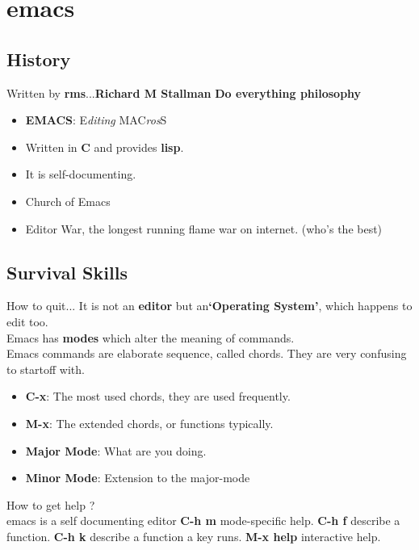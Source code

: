 \documentclass{beamer}
\begin{document}
\section{emacs}

\subsection{History}
\begin{frame}{Written by \textbf{rms}...}{\textbf{Richard M Stallman}}
	\textbf{Do everything philosophy} \\
	\pause
	\begin{itemize}
		\item {
				\textbf{EMACS}: \alert{E}\textit{diting} \alert{MAC}\textit{ros}\alert{S}
				\pause

			}
		\item {
				Written in \textbf{C} and provides \textbf{lisp}.
				\pause

			}
		\item {
				It is self-documenting.
				\pause
			}
		\item {
				Church of Emacs
				\pause
			}
		\item {
				Editor War, the longest running flame war on internet. (who's the best)

			}
	\end{itemize}
\end{frame}

\subsection{Survival Skills}
\begin{frame}{How to quit...}
	It is not an \textbf{editor} but an\textbf{`Operating System'}, which happens to edit too.\\
	Emacs has \textbf{modes} which alter the meaning of commands. \\
	Emacs commands are elaborate sequence, called \alert{chords}. They are very confusing to startoff with.
	\begin{itemize}
		\item {
			\textbf{C-x}: The most used chords, they are used frequently.
			\pause
			}

		\item {   
			\textbf{M-x}: The extended chords, or functions typically.
			\pause

			}
		\item {
			\textbf{Major Mode}: What are you doing.
			\pause
			}
		\item {
			\textbf{Minor Mode}: Extension to the major-mode
			\pause
			}
	\end{itemize}
	How to get \alert{help }?\\ \pause
	emacs is a self documenting editor
	\textbf{C-h m} mode-specific help.
	\textbf{C-h f} describe a function.
	\textbf{C-h k} describe a function a key runs.
	\textbf{M-x help} interactive help.

\end{frame}
\end{document}
